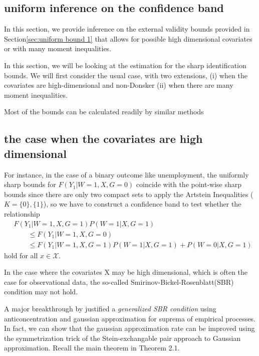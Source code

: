 \documentclass[uplatex,dvipdfmx]{jsarticle}
\begin{document}
\subsection{ uniform inference on the confidence band }

In this section, we provide inference on the external validity bounds provided in Section\ref{sec:uniform bound 1} that allows for possible high dimensional covariates or with many moment inequalities.  






In this section, we will be looking at the estimation for the sharp identification bounds. We will first consider the usual case, with two extensions, (i) when the covariates are high-dimensional and non-Donsker (ii) when there are many moment inequalities.

Most of the bounds can be calculated readily by similar methods

\subsection{the case when the covariates are high dimensional}

For instance, in the case of a binary outcome like unemployment, the uniformly sharp bounds for $F(Y_1| W=1, X, G=0)$ coincide with the point-wise sharp bounds since there are only two compact sets to apply the Artstein Inequalities ($K=\{0\}, \{1\}$), so we have to construct a confidence band to test whether 
the relationship
\begin{align}
    &F(Y_1 | W=1,X,G=1) P(W=1| X, G=1) \\
    &\hspace{2em}\leq F(Y_1| W=1, X, G=0) \\ 
    &\hspace{2em}\leq F(Y_1 | W=1,X,G=1) P(W=1 | X, G=1) + P(W=0 | X, G=1)
\end{align}
hold for all $ x \in \mathcal{X}$. 

In the case where the covariates X may be high dimensional, which is often the case for observational data, the so-called Smirinov-Bickel-Rosenblatt(SBR) condition may not hold.


A major breakthrough by \cite{chernozhukov2014anti} justified a \textit{generalized SBR condition} using anticoncentration and gaussian approximation for 
suprema of empirical processes. In fact, we can show that the gaussian approximation rate can be improved using the symmetrization trick of the Stein-exchangable pair approach to Gaussian approximation. Recall the main theorem in \cite{chernozhukov2014gaussian} Theorem 2.1.
\end{document}
